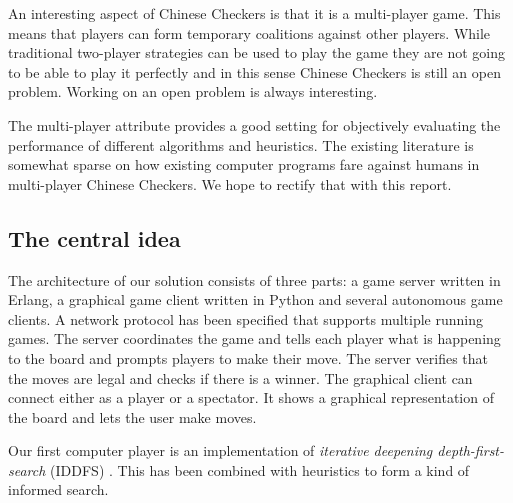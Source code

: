 \documentclass[a4paper,11pt]{article}
\begin{document}
An interesting aspect of Chinese Checkers is that it is a multi-player
game. This means that players can form temporary coalitions against
other players. While traditional two-player strategies can be used to
play the game they are not going to be able to play it perfectly and
in this sense Chinese Checkers is still an open problem. Working on an
open problem is always interesting.

The multi-player attribute provides a good setting for objectively
evaluating the performance of different algorithms and heuristics. The
existing literature is somewhat sparse on how existing computer
programs fare against humans in multi-player Chinese Checkers. We hope
to rectify that with this report.

\subsection{The central idea}

The architecture of our solution consists of three parts: a game
server written in Erlang, a graphical game client written in Python
and several autonomous game clients. A network protocol has been
specified that supports multiple running games. The server coordinates
the game and tells each player what is happening to the board and
prompts players to make their move. The server verifies that the moves
are legal and checks if there is a winner. The graphical client can
connect either as a player or a spectator. It shows a graphical
representation of the board and lets the user make moves.


Our first computer player is an implementation of \emph{iterative
  deepening depth-first-search} (IDDFS) \cite{aimodern}. This has been
combined with heuristics to form a kind of informed search.

\end{document}
